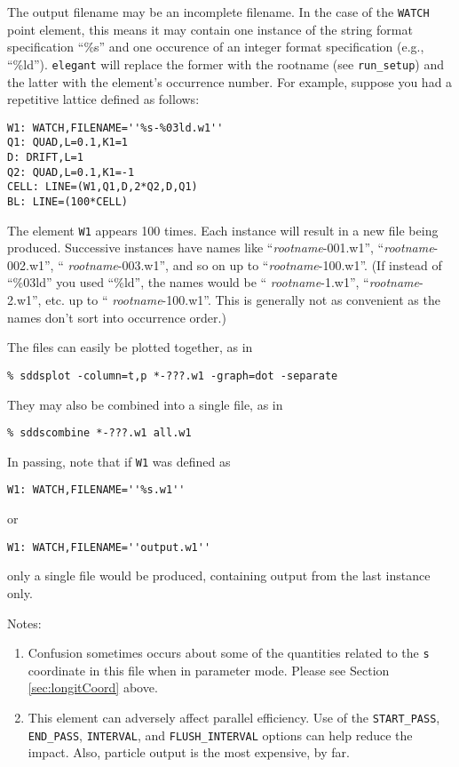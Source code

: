 The output filename may be an incomplete filename.  In the case of the
\verb|WATCH| point element, this means it may contain one instance of
the string format specification ``\%s'' and one occurence of an
integer format specification (e.g., ``\%ld'').  {\tt elegant} will
replace the former with the rootname (see
\verb|run_setup|) and the latter with the element's occurrence
number.  For example, suppose you had a repetitive lattice defined as
follows:
\begin{verbatim}
W1: WATCH,FILENAME=''%s-%03ld.w1''
Q1: QUAD,L=0.1,K1=1
D: DRIFT,L=1
Q2: QUAD,L=0.1,K1=-1
CELL: LINE=(W1,Q1,D,2*Q2,D,Q1)
BL: LINE=(100*CELL)
\end{verbatim}
The element \verb|W1| appears 100 times.  Each instance will result in
a new file being produced.  Successive instances have names like
``{\em rootname}-001.w1'', ``{\em rootname}-002.w1'', ``{\em
rootname}-003.w1'', and so on up to ``{\em rootname}-100.w1''.  (If
instead of ``\%03ld'' you used ``\%ld'', the names would be ``{\em
rootname}-1.w1'', ``{\em rootname}-2.w1'', etc. up to ``{\em
rootname}-100.w1''.  This is generally not as convenient as the names
don't sort into occurrence order.)

The files can easily be plotted together, as in 
\begin{verbatim}
% sddsplot -column=t,p *-???.w1 -graph=dot -separate 
\end{verbatim}
They may also be combined into a single file, as in
\begin{verbatim}
% sddscombine *-???.w1 all.w1 
\end{verbatim}

In passing, note that if \verb|W1| was defined as
\begin{verbatim}
W1: WATCH,FILENAME=''%s.w1''
\end{verbatim}
or 
\begin{verbatim}
W1: WATCH,FILENAME=''output.w1''
\end{verbatim}
only a single file would be produced, containing output from the last instance
only.

Notes: 
\begin{enumerate}
\item Confusion sometimes occurs about some of the quantities related
  to the {\tt s} coordinate in this file when in parameter mode.  Please
  see Section \ref{sec:longitCoord} above.
\item This element can adversely affect parallel efficiency. Use of the
  \verb|START_PASS|, \verb|END_PASS|, \verb|INTERVAL|,  and \verb|FLUSH_INTERVAL|
  options can help reduce the impact. Also, particle output is the most expensive, by far.
\end{enumerate}

